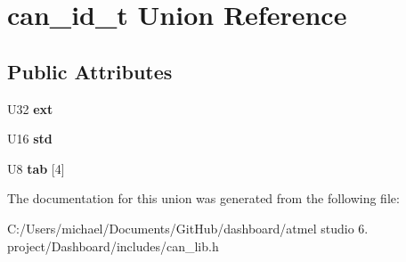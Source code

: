 \hypertarget{unioncan__id__t}{\section{can\-\_\-id\-\_\-t Union Reference}
\label{unioncan__id__t}
}
\subsection*{Public Attributes}
\begin{DoxyCompactItemize}
\item 
\hypertarget{unioncan__id__t_a96a90a426016c36ae2e9034ac5c736b0}{U32 {\bfseries ext}}\label{unioncan__id__t_a96a90a426016c36ae2e9034ac5c736b0}

\item 
\hypertarget{unioncan__id__t_a47965ba2fc973b40ef7c4aaf822336bf}{U16 {\bfseries std}}\label{unioncan__id__t_a47965ba2fc973b40ef7c4aaf822336bf}

\item 
\hypertarget{unioncan__id__t_a095ce9a7708af8b6b1197b4c5e8e4f75}{U8 {\bfseries tab} \mbox{[}4\mbox{]}}\label{unioncan__id__t_a095ce9a7708af8b6b1197b4c5e8e4f75}

\end{DoxyCompactItemize}


The documentation for this union was generated from the following file\-:\begin{DoxyCompactItemize}
\item 
C\-:/\-Users/michael/\-Documents/\-Git\-Hub/dashboard/atmel studio 6. project/\-Dashboard/includes/can\-\_\-lib.\-h\end{DoxyCompactItemize}
